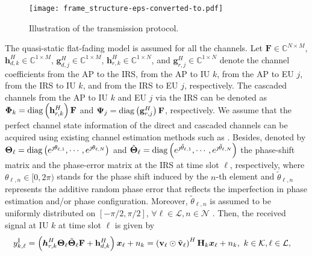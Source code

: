 \documentclass[12pt,draftclsnofoot, onecolumn]{IEEEtran}
\newcommand{\bm}[1]{\mbox{\boldmath{$#1$}}}
\theoremstyle{plain}
\begin{document}
\begin{sloppypar}
\begin{figure}[!t]
	\centering
	\texttt{[image: frame\_structure-eps-converted-to.pdf]}\vspace{-1.5mm}
	\caption{Illustration of the transmission protocol.}
	\label{fig:frame_structure}
	\vspace{-3mm}
\end{figure}

The quasi-static flat-fading model is assumed for all the channels. Let $\mathbf F \in\mathbb C^{N\times M}$, $\mathbf h_{d,k}^H \in\mathbb C^{1\times M}$, $\mathbf g_{d,j}^H \in\mathbb C^{1\times M}$, $\mathbf h_{r,k}^H \in\mathbb C^{1\times N}$, and $\mathbf g_{r,j}^H \in\mathbb C^{1\times N}$ denote the channel coefficients from the AP to the IRS, from the AP to IU $k$, from the AP to EU $j$, from the IRS to IU $k$, and from the IRS to EU $j$, respectively. The cascaded channels from the AP to IU $k$ and EU $j$ via the IRS can be denoted as $\mathbf \Phi_k = {\rm diag}\left(\mathbf h_{r,k}^H\right)\mathbf F$ and $\mathbf \Psi_j = {\rm diag}\left(\mathbf g_{r,j}^H\right)\mathbf F$, respectively. We assume that the perfect channel state information of the direct and cascaded channels can be acquired using existing channel estimation methods such as \cite{2020_G.T._Channel_PARAFAC-Based, 2021_Wei_Channel_RIS-Empowered}. Besides, denoted by $\mathbf \Theta_\ell = {\rm diag}\left( e^{\jmath \theta_{\ell,1}}, \cdots, e^{\jmath \theta_{\ell,N}}\right)$ and $\tilde{\mathbf \Theta}_\ell = {\rm diag}\left( e^{\jmath \tilde{\theta}_{\ell,1}}, \cdots, e^{\jmath \tilde{\theta}_{\ell,N}}\right)$ the phase-shift matrix and the phase-error matrix at the IRS at time slot $\ell$, respectively, where $\theta_{\ell,n} \in [0,2\pi)$ stands for the phase shift induced by the $n$-th element and $\tilde{\theta}_{\ell,n}$ represents the additive random phase error that reflects the imperfection in phase estimation and/or phase configuration. Moreover, $\tilde{\theta}_{\ell,n}$ is assumed to be uniformly distributed on $\left[-{\pi}/{2}, {\pi}/{2}\right]$, $\forall \ell \in\mathcal L, n\in\mathcal N$ \cite{2021_Xing_error}. Then, the received signal at IU $k$ at time slot $\ell$ is given by 
\begin{align}
y_{k,\ell}^{\rm I} & = \left(\bm h_{r,k}^H\mathbf \Theta_\ell\tilde{\mathbf \Theta}_{\ell}\mathbf F + \mathbf h_{d,k}^H \right) \bm x_\ell + n_k = \left(\mathbf v_\ell\odot\tilde {\mathbf v}_\ell\right)^H\mathbf H_k\bm x_\ell + n_k, \ k\in\mathcal K, \ell\in\mathcal L, 

\end{align}
\end{sloppypar}
\end{document}
